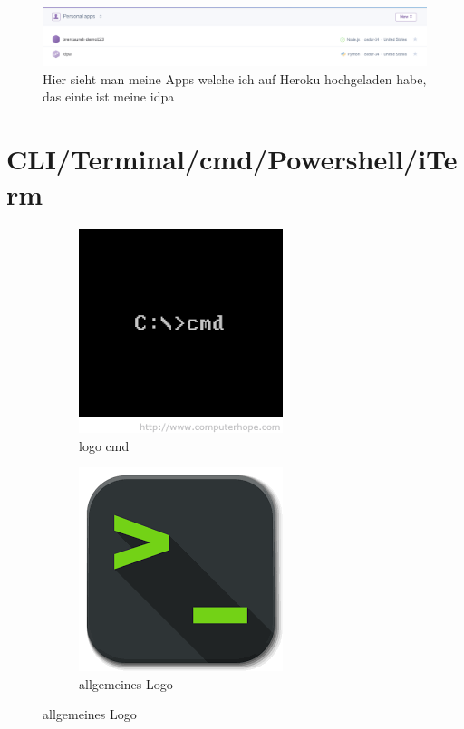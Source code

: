 \documentclass{article}
\begin{document}
\begin{figure}[ht]
    \centering
    \includegraphics[width=.8\linewidth]{heroku-apps}
    \caption{Hier sieht man meine Apps welche ich auf Heroku hochgeladen habe, das einte ist meine idpa}
    \label{fig:sub1}
    \end{figure}
\cleardoublepage






\section{CLI/Terminal/cmd/Powershell/iTerm}


\begin{figure}[ht]
\centering
\begin{subfigure}{.5\textwidth}
  \centering
  \includegraphics[width=.5\linewidth]{download-1}
  \caption{logo cmd}
  \label{fig:sub1}
\end{subfigure}%
\begin{subfigure}{.5\textwidth}
  \centering
  \includegraphics[width=.5\linewidth]{download-2}
  \caption{allgemeines Logo}
  \label{fig:sub2}
\end{subfigure}
\end{figure}
\end{document}

